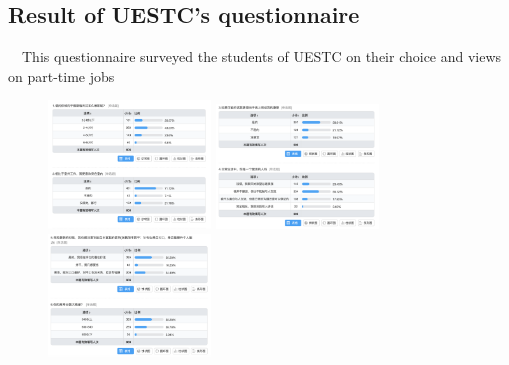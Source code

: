 \documentclass[12pt]{article}
\begin{document}
\begin{appendix}
    \section{Result of UESTC's questionnaire}
    ~~This questionnaire surveyed the students of UESTC on their choice and views on part-time jobs
    \begin{figure}[htbp]
        \centering
        {
        \begin{minipage}[t]{0.3\linewidth}
        \centering
        \includegraphics[width=1.7in]{figure/pic1.png}
        \end{minipage}%
        }%
        {
        \begin{minipage}[t]{0.3\linewidth}
        \centering
        \includegraphics[width=1.7in]{figure/pic2.png}
        \end{minipage}%
        }%
        {
        \begin{minipage}[t]{0.3\linewidth}
        \centering
        \includegraphics[width=1.7in]{figure/pic3.png}
        \end{minipage}
        }%
        {
        \begin{minipage}[t]{0.3\linewidth}
        \centering

\end{minipage}}
\end{figure}
\end{appendix}
\end{document}
